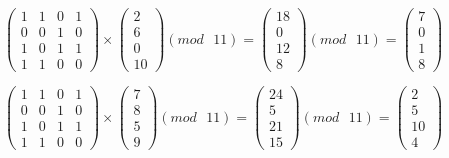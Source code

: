 \documentclass[a5paper, 10pt]{article}
\theoremstyle{definition}
\theoremstyle{plain}
\theoremstyle{remark}
\begin{document}
\begin{equation}
\begin{pmatrix}
1 & 1 & 0 & 1\\
0 & 0 & 1 & 0 \\
1 & 0 & 1 & 1 \\
1 & 1 & 0 & 0
\end{pmatrix}
 \times
\begin{pmatrix}
 2\\
6\\
0\\
10
\end{pmatrix}
(mod \text{ }11)
= 
\begin{pmatrix}
18\\
0\\
12\\
8
\end{pmatrix}
(mod \text{ }11)
= \begin{pmatrix}
7\\
0\\
1\\
8
\end{pmatrix}
\end{equation}

\begin{equation}
\begin{pmatrix}
1 & 1 & 0 & 1\\
0 & 0 & 1 & 0 \\
1 & 0 & 1 & 1 \\
1 & 1 & 0 & 0
\end{pmatrix}
 \times
\begin{pmatrix}
7\\
8\\
 5\\
9
\end{pmatrix}
(mod \text{ }11)
= 
\begin{pmatrix}
24\\
5\\
21\\
15
\end{pmatrix}
(mod \text{ }11)
= \begin{pmatrix}
2\\
5\\
10\\
4
\end{pmatrix}
\end{equation}
\end{document}
